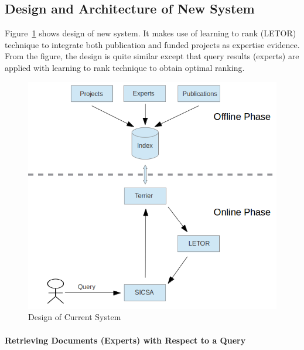 \subsection{Design and Architecture of New System} \label{section:union}
Figure~\ref{fig:newDesign} shows design of new system. It makes use of learning to rank (LETOR) technique to integrate 
both publication and funded projects as expertise evidence. From the figure, the design is quite similar except that query results (experts) are
applied with learning to rank technique to obtain optimal ranking.

 \begin{figure}
 \centering
 \includegraphics[scale=0.5,keepaspectratio]{./figures/newSystemDesign.png}
 \caption{Design of Current System} \label{fig:newDesign} 
\end{figure}

\paragraph{Retrieving Documents (Experts) with Respect to a Query} \hspace{0pt} \\

